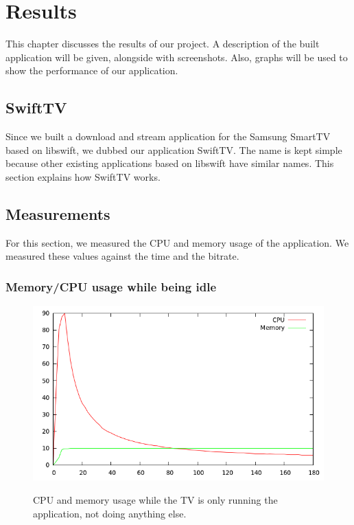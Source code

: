 \chapter{Results}
This chapter discusses the results of our project. A description of the built application will be given, alongside with screenshots.
Also, graphs will be used to show the performance of our application.

\section{SwiftTV}
Since we built a download and stream application for the Samsung SmartTV based on libswift, we dubbed our application SwiftTV.
The name is kept simple because other existing applications based on libswift have similar names. This section explains how SwiftTV works.

\section{Measurements}
For this section, we measured the CPU and memory usage of the application. We measured these values against the time and the bitrate.

\newpage
\subsection{Memory/CPU usage while being idle}

\begin{center}
\begin{figure}[h]
	\centering
	\mbox{\includegraphics[width=1.2\textwidth]{Images/idle.png}}
	\label{graph:idle}
	\caption{CPU and memory usage while the TV is only running the application, not doing anything else.}
\end{figure}
\end{center}
